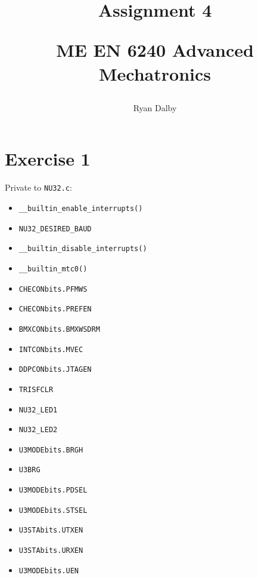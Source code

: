 \documentclass[12pt]{article}
\title{
    Assignment 4 

    \large{
        ME EN 6240 Advanced Mechatronics
    }  
}
\author{
        Ryan Dalby
}
\date{\displaydate{date}}
\begin{document}
\maketitle

\section*{Exercise 1}
Private to \verb|NU32.c|:
\begin{itemize}
    \item 
    \verb|__builtin_enable_interrupts()|

    \item
    \verb|NU32_DESIRED_BAUD|

    \item
    \verb|__builtin_disable_interrupts()|

    \item
    \verb|__builtin_mtc0()|

    \item 
    \verb|CHECONbits.PFMWS|

    \item 
    \verb|CHECONbits.PREFEN|
    \item 
    \verb|BMXCONbits.BMXWSDRM|

    \item 
    \verb|INTCONbits.MVEC|

    \item 
    \verb|DDPCONbits.JTAGEN|

    \item 
    \verb|TRISFCLR|

    \item 
    \verb|NU32_LED1|

    \item 
    \verb|NU32_LED2|

    \item 
    \verb|U3MODEbits.BRGH|

    \item 
    \verb|U3BRG|

    \item 
    \verb|U3MODEbits.PDSEL|

    \item 
    \verb|U3MODEbits.STSEL|

    \item 
    \verb|U3STAbits.UTXEN|

    \item 
    \verb|U3STAbits.URXEN|

    \item 
    \verb|U3MODEbits.UEN|


\end{itemize}
\end{document}
